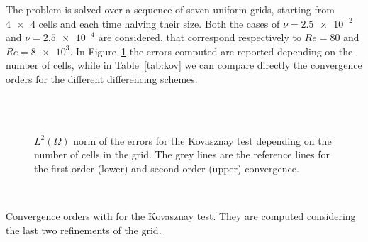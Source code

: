 The problem is solved over a sequence of seven uniform grids, starting from 
$\num{4x4}$ cells and each time halving their size. Both the cases of 
$\nu=\num{2.5e-2}$ and $\nu=\num{2.5e-4}$ are considered, that correspond respectively to 
$Re=80$ and $Re=\num{8e3}$. In Figure~\ref{fig:kov_err} the errors 
computed are reported depending on the number of cells, while in 
Table~\ref{tab:kov} we can compare directly the 
convergence orders for the different differencing schemes.
\begin{figure}
	\centering
	\subfloat[Upwind, $Re = 80$]{
		}
	\subfloat[Upwind, $Re = \num{8e3}$]{
		}\\
	\subfloat[Min-Mod, $Re = 80$]{
		}
	\subfloat[Min-Mod, $Re = \num{8e3}$]{
		}\\
	\subfloat[Van Leer, $Re = 80$]{
		}
	\subfloat[Van Leer, $Re = \num{8e3}$]{
		}
	\caption[$L^2(\Omega)$ norm of the errors for the Kovasznay 
	test]{$L^2(\Omega)$ norm of the errors for the 
	Kovasznay test depending on the number of cells in the grid. The grey 
	lines are the reference lines for the first-order (lower) and second-order 
	(upper) convergence.}
	\label{fig:kov_err}
\end{figure}
\begin{table}
	\centering
	\\
	\caption[Convergence orders for the Kovasznay 
	test]{Convergence orders with for the Kovasznay 
	test. They are computed considering the last two refinements of the 
	grid.}
	\label{tab:kov}
\end{table}

